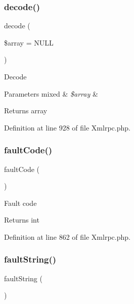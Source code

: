 \subsubsection{\texorpdfstring{decode()}{decode()}}
{\footnotesize\ttfamily decode (\begin{DoxyParamCaption}\item[{}]{\$array = {\ttfamily NULL} }\end{DoxyParamCaption})}

Decode


\begin{DoxyParams}[1]{Parameters}
mixed & {\em \$array} & \\
\hline
\end{DoxyParams}
\begin{DoxyReturn}{Returns}
array 
\end{DoxyReturn}


Definition at line 928 of file Xmlrpc.\+php.

\mbox{\label{class_x_m_l___r_p_c___response_ad6849a82f23db4d67e06a7fcaa94aec2}} 
\subsubsection{\texorpdfstring{faultCode()}{faultCode()}}
{\footnotesize\ttfamily fault\+Code (\begin{DoxyParamCaption}{ }\end{DoxyParamCaption})}

Fault code

\begin{DoxyReturn}{Returns}
int 
\end{DoxyReturn}


Definition at line 862 of file Xmlrpc.\+php.

\mbox{\label{class_x_m_l___r_p_c___response_a2f922009ed0801616d3df198a48d193b}} 
\subsubsection{\texorpdfstring{faultString()}{faultString()}}
{\footnotesize\ttfamily fault\+String (\begin{DoxyParamCaption}{ }\end{DoxyParamCaption})}

